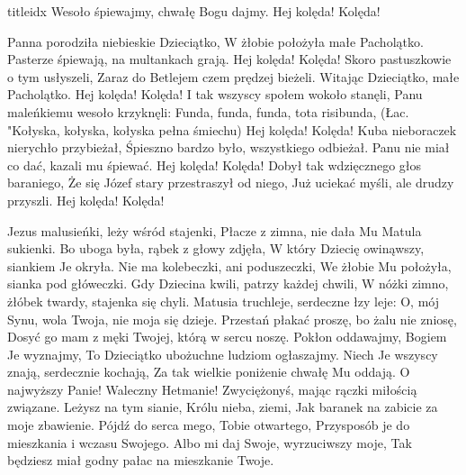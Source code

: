 \documentclass[a5paper, portrait, 12pt]{mwart}
\begin{document}
\begin{songs}{titleidx}
\beginchorus
        Wesoło śpiewajmy, chwałę Bogu dajmy.
        Hej kolęda! Kolęda!
\endchorus

\beginverse
    Panna porodziła niebieskie Dzieciątko,
    W żłobie położyła małe Pacholątko.
\endverse		
\beginchorus
        Pasterze śpiewają, na multankach grają.
        Hej kolęda! Kolęda!	
\endchorus	
\beginverse
    Skoro pastuszkowie o tym usłyszeli,
    Zaraz do Betlejem czem prędzej bieżeli.
\endverse
\beginchorus
        Witając Dzieciątko, małe Pacholątko.
        Hej kolęda! Kolęda!
\endchorus
\beginverse
    I tak wszyscy społem wokoło stanęli,
    Panu maleńkiemu wesoło krzyknęli:
\endverse
\beginchorus
        Funda, funda, funda, tota risibunda,
        {\tiny (Łac. "Kołyska, kołyska, kołyska pełna śmiechu)}
        Hej kolęda! Kolęda!
\endchorus
\beginverse
    Kuba nieboraczek nierychło przybieżał,
    Śpieszno bardzo było, wszystkiego odbieżał.
\endverse
\beginchorus
        Panu nie miał co dać, kazali mu śpiewać.
        Hej kolęda! Kolęda!
\endchorus
\beginverse
    Dobył tak wdzięcznego głos baraniego,
    Że się Józef stary przestraszył od niego,
\endverse
\beginchorus
    Już uciekać myśli, ale drudzy przyszli.
    Hej kolęda! Kolęda!
\endchorus
\endsong






\beginverse
    Jezus malusieńki, leży wśród stajenki,
    Płacze z zimna, nie dała Mu Matula sukienki.
\endverse
\beginverse
    Bo uboga była, rąbek z głowy zdjęła,
    W który Dziecię owinąwszy, siankiem Je okryła.
\endverse
\beginverse
    Nie ma kolebeczki, ani poduszeczki,
    We żłobie Mu położyła, sianka pod główeczki.
\endverse
\beginverse
    Gdy Dziecina kwili, patrzy każdej chwili,
    W nóżki zimno, żłóbek twardy, stajenka się chyli.
\endverse
\beginverse
    Matusia truchleje, serdeczne łzy leje:
    O, mój Synu, wola Twoja, nie moja się dzieje.
\endverse
\beginverse
    Przestań płakać proszę, bo żalu nie zniosę,
    Dosyć go mam z męki Twojej, którą w sercu noszę.
\endverse
\beginverse
    Pokłon oddawajmy, Bogiem Je wyznajmy,
    To Dzieciątko ubożuchne ludziom ogłaszajmy.
\endverse
\beginverse
    Niech Je wszyscy znają, serdecznie kochają,
    Za tak wielkie poniżenie chwałę Mu oddają.
\endverse
\beginverse
    O najwyższy Panie! Waleczny Hetmanie!
    Zwyciężonyś, mając rączki miłością związane.
\endverse
\beginverse
    Leżysz na tym sianie, Królu nieba, ziemi,
    Jak baranek na zabicie za moje zbawienie.
\endverse
\beginverse
    Pójdź do serca mego, Tobie otwartego,
    Przysposób je do mieszkania i wczasu Swojego.
\endverse
\beginverse
    Albo mi daj Swoje, wyrzuciwszy moje,
    Tak będziesz miał godny pałac na mieszkanie Twoje.
\endverse
\endsong


\end{songs}
\end{document}
